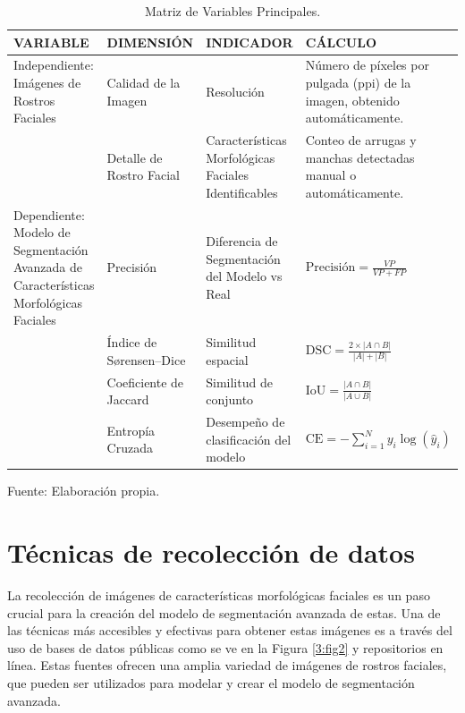 \begin{longtable}{>{\centering\arraybackslash}m{3cm} >{\centering\arraybackslash}m{2.5cm} >{\centering\arraybackslash}m{2.5cm} >{\raggedright\arraybackslash}m{7cm}}
    \caption{Matriz de Variables Principales.}
    \label{tabla:variables}\\
    \hline
    VARIABLE & DIMENSIÓN & INDICADOR & CÁLCULO \\
    \hline
    Independiente: Imágenes de Rostros Faciales & Calidad de la Imagen & Resolución & Número de píxeles por pulgada (ppi) de la imagen, obtenido automáticamente. \\
    \cline{2-4}
     & Detalle de Rostro Facial & Características Morfológicas Faciales Identificables & Conteo de arrugas y manchas detectadas manual o automáticamente. \\
    \hline
    Dependiente: Modelo de Segmentación Avanzada de Características Morfológicas Faciales & Precisión & Diferencia de Segmentación del Modelo vs Real & $\text{Precisión} = \frac{VP}{VP + FP}$ \\ 
    \cline{2-4}
     & Índice de Sørensen–Dice & Similitud espacial & $\text{DSC} = \frac{2 \times |A \cap B|}{|A| + |B|}$ \\
    \cline{2-4}
     & Coeficiente de Jaccard & Similitud de conjunto & $\text{IoU} = \frac{|A \cap B|}{|A \cup B|}$ \\
    \cline{2-4}
     & Entropía Cruzada & Desempeño de clasificación del modelo & $\text{CE} = -\sum_{i=1}^{N} y_i \log(\hat{y}_i)$ \\
    \hline
\end{longtable}
\begin{flushleft}
	\small Fuente: Elaboración propia.
\end{flushleft}

\section{Técnicas de recolección de datos}
La recolección de imágenes de características morfológicas faciales es un paso crucial para la creación del modelo de segmentación avanzada de estas. Una de las técnicas más accesibles y efectivas para obtener estas imágenes es a través del uso de bases de datos públicas como se ve en la Figura \ref{3:fig2} y repositorios en línea. Estas fuentes ofrecen una amplia variedad de imágenes de rostros faciales, que pueden ser utilizados para modelar y crear el modelo de segmentación avanzada.

